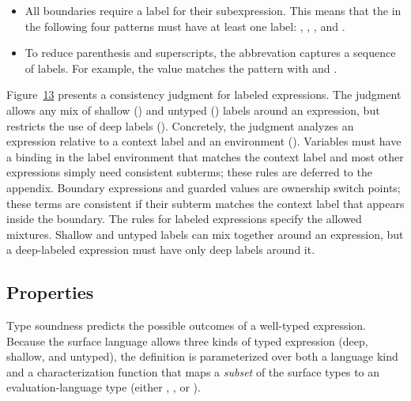\documentclass[screen=true, natbib=false, 10pt, sigplan]{acmart}
\newlength{\stabLeft}
\newcommand{\atItemizeStart}[0]{\addtolength{\stabLeft}{\labelsep}
                                \addtolength{\stabLeft}{\labelwidth}}
\let\SOriginalthesubsubsection\thesubsubsection
\newcommand{\Ssubsection}[2]{\subsection[#1]{#2}\let\thesubsubsection\SOriginalthesubsubsection}
\newcommand{\FigureRef}[2]{#1}
\begin{document}
\noindent \begin{itemize}\atItemizeStart

\item All boundaries require a label for their subexpression.
This means that the  in the following four patterns must have at least one
label: ,
, , and .

\item To reduce parenthesis and superscripts, the abbrevation \relax{$\obbars{\cdot}{\cdot}$}
captures a sequence of labels.
For example, the value 
matches the pattern 
with 
and .\end{itemize}

Figure~\hyperref[t:x28counter_x28x22figurex22_x22figx3amodelx3aownershipx2dconsistencyx22x29x29]{\FigureRef{13}{t:x28counter_x28x22figurex22_x22figx3amodelx3aownershipx2dconsistencyx22x29x29}} presents a consistency
judgment for labeled expressions.
The judgment allows any mix of shallow (\relax{$\sS$}) and untyped (\relax{$\sU$})
labels around an expression, but restricts the use of deep labels (\relax{$\sD$}).
Concretely, the judgment analyzes an expression relative to a context label
and an environment (\relax{$\sownerenv$}).
Variables must have a binding in the label environment that matches the
context label and most other expressions simply need consistent subterms;
these rules are deferred to the appendix.
Boundary expressions and guarded values are ownership switch points; these terms
are consistent if their subterm matches the context label that appears
inside the boundary.
The rules for labeled expressions specify the allowed mixtures.
Shallow and untyped labels can mix together around an expression,
but a deep{-}labeled expression must have only deep labels around it.

\Ssubsection{Properties}{Properties}\label{t:x28part_x22secx3amodelx3amodelx3atheoremsx22x29}

Type soundness predicts the possible outcomes of a well{-}typed expression.
Because the surface language allows three kinds of typed expression
(deep, shallow, and untyped), the definition is
parameterized over both a language kind \relax{$\slang$} and a characterization
function \relax{$\stypemap$} that maps a \emph{subset} of the surface types \relax{$\stspec$}
to an evaluation{-}language type (either \relax{$\stype$}, \relax{$\sshape$}, or \relax{$\tdyn$}).
\end{document}
